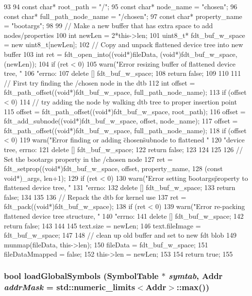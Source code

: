 \begin{DoxyCode}
93 {
94     const char* root_path = "/";
95     const char* node_name = "chosen";
96     const char* full_path_node_name = "/chosen";
97     const char* property_name = "bootargs";
98 
99     // Make a new buffer that has extra space to add nodes/properties
100     int newLen = 2*this->len;
101     uint8_t* fdt_buf_w_space = new uint8_t[newLen];
102     // Copy and unpack flattened device tree into new buffer
103     int ret = fdt_open_into((void*)fileData, (void*)fdt_buf_w_space, (newLen));
104     if (ret < 0) {
105         warn("Error resizing buffer of flattened device tree, "
106              "errno: %
107         delete [] fdt_buf_w_space;
108         return false;
109     }
110 
111     // First try finding the /chosen node in the dtb
112     int offset = fdt_path_offset((void*)fdt_buf_w_space, full_path_node_name);
113     if (offset < 0) {
114         // try adding the node by walking dtb tree to proper insertion point
115         offset = fdt_path_offset((void*)fdt_buf_w_space, root_path);
116         offset = fdt_add_subnode((void*)fdt_buf_w_space, offset, node_name);
117         offset = fdt_path_offset((void*)fdt_buf_w_space, full_path_node_name);
118         if (offset < 0) {
119             warn("Error finding or adding \"chosen\" subnode to flattened "
120                  "device tree, errno: %
121             delete [] fdt_buf_w_space;
122             return false;
123         }
124     }
125 
126     // Set the bootargs property in the /chosen node
127     ret = fdt_setprop((void*)fdt_buf_w_space, offset, property_name,
128                       (const void*)_args, len+1);
129     if (ret < 0) {
130         warn("Error setting \"bootargs\" property to flattened device tree, "
131              "errno: %
132         delete [] fdt_buf_w_space;
133         return false;
134     }
135 
136     // Repack the dtb for kernel use
137     ret = fdt_pack((void*)fdt_buf_w_space);
138     if (ret < 0) {
139         warn("Error re-packing flattened device tree structure, "
140              "errno: %
141         delete [] fdt_buf_w_space;
142         return false;
143     }
144 
145     text.size = newLen;
146     text.fileImage = fdt_buf_w_space;
147 
148     // clean up old buffer and set to new fdt blob
149     munmap(fileData, this->len);
150     fileData = fdt_buf_w_space;
151     fileDataMmapped = false;
152     this->len = newLen;
153 
154     return true;
155 }
\end{DoxyCode}
\hypertarget{classDtbObject_a1de102f86bbb53d20455d9e78be53935}{
\subsubsection[{loadGlobalSymbols}]{\setlength{\rightskip}{0pt plus 5cm}bool loadGlobalSymbols ({\bf SymbolTable} $\ast$ {\em symtab}, \/  {\bf Addr} {\em addrMask} = {\ttfamily std::numeric\_\-limits$<${\bf Addr}$>$::max()})}}
\label{classDtbObject_a1de102f86bbb53d20455d9e78be53935}


